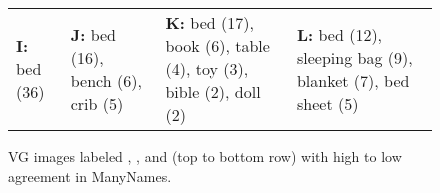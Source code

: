 \begin{figure*}[t]
{\begin{tabular}{p{3.4cm}p{3.4cm}p{3.6cm}p{3.6cm}}
 \textbf{I:} bed (36)  &
 \textbf{J:} bed (16), bench (6), crib (5) &
 \textbf{K:} bed (17), book (6), table (4), toy (3), bible (2), doll (2) &
 \textbf{L:} bed (12), sleeping bag (9), blanket (7), bed sheet (5)\\

       \end{tabular}
    }
  \caption{VG images labeled , , and  (top to bottom row) with high to low agreement in ManyNames.} 
	\label{fig:ex-high-low-agreement}
\end{figure*}




